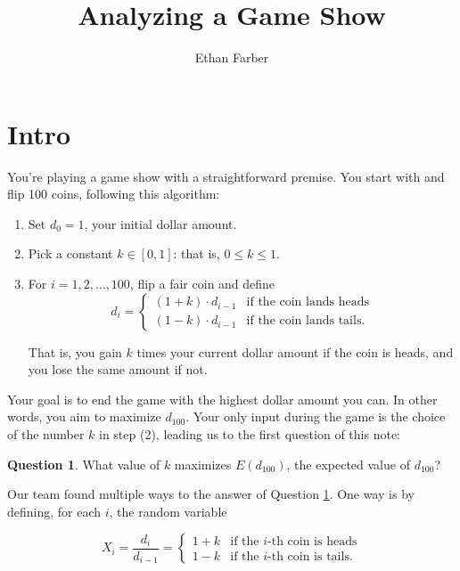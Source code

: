 \documentclass[12pt, oneside]{book}
\title{Analyzing a Game Show}
\author{Ethan Farber}
\theoremstyle{plain}
\theoremstyle{definition}
\newtheorem{question}[thm]{Question}
\begin{document}
\newpage

\maketitle


\section{Intro}

You're playing a game show with a straightforward premise. You start with  and flip 100 coins, following this algorithm:

\begin{enumerate}
\item Set $d_0=1$, your initial dollar amount.
\item Pick a constant $k \in [0,1]$: that is, $0 \leq k \leq 1$.
\item For $i=1, 2, \ldots, 100$, flip a fair coin and define
\[
d_i=
\begin{cases}
(1+k) \cdot d_{i-1} & \text{if the coin lands heads}\\
(1-k) \cdot d_{i-1} & \text{if the coin lands tails.}
\end{cases}
\]

That is, you gain $k$ times your current dollar amount if the coin is heads, and you lose the same amount if not.
\end{enumerate}

\noindent Your goal is to end the game with the highest dollar amount you can. In other words, you aim to maximize $d_{100}$. Your only input during the game is the choice of the number $k$ in step (2), leading us to the first question of this note:

\begin{question}\label{question:expect1}
What value of $k$ maximizes $E(d_{100})$, the expected value of $d_{100}$?
\end{question}

Our team found multiple ways to the answer of Question \ref{question:expect1}. One way is by defining, for each $i$, the random variable

\[
X_i = \frac{d_i}{d_{i-1}} = \begin{cases}
1+k & \text{if the $i$-th coin is heads}\\
1-k & \text{if the $i$-th coin is tails.}
\end{cases}
\]
\end{document}
